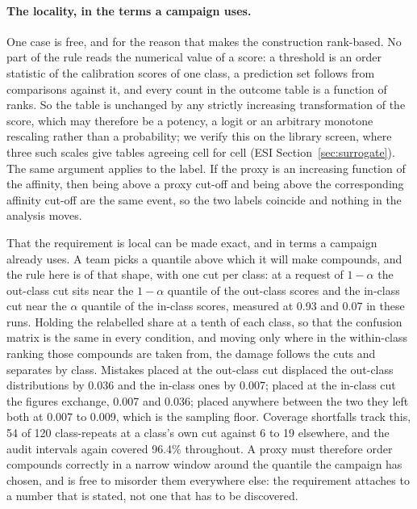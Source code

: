 \documentclass[10pt]{article}
\begin{document}
\paragraph{The locality, in the terms a campaign uses.}
One case is free, and for the reason that makes the construction rank-based. No part of the rule reads the numerical value of a score: a threshold is an order statistic of the calibration scores of one class, a prediction set follows from comparisons against it, and every count in the outcome table is a function of ranks. So the table is unchanged by any strictly increasing transformation of the score, which may therefore be a potency, a logit or an arbitrary monotone rescaling rather than a probability; we verify this on the library screen, where three such scales give tables agreeing cell for cell (ESI Section~\ref{sec:surrogate}). The same argument applies to the label. If the proxy is an increasing function of the affinity, then being above a proxy cut-off and being above the corresponding affinity cut-off are the same event, so the two labels coincide and nothing in the analysis moves.

That the requirement is local can be made exact, and in terms a campaign already uses. A team picks a quantile above which it will make compounds, and the rule here is of that shape, with one cut per class: at a request of $1-\alpha$ the out-class cut sits near the $1-\alpha$ quantile of the out-class scores and the in-class cut near the $\alpha$ quantile of the in-class scores, measured at 0.93 and 0.07 in these runs. Holding the relabelled share at a tenth of each class, so that the confusion matrix is the same in every condition, and moving only where in the within-class ranking those compounds are taken from, the damage follows the cuts and separates by class. Mistakes placed at the out-class cut displaced the out-class distributions by 0.036 and the in-class ones by 0.007; placed at the in-class cut the figures exchange, 0.007 and 0.036; placed anywhere between the two they left both at 0.007 to 0.009, which is the sampling floor. Coverage shortfalls track this, 54 of 120 class-repeats at a class's own cut against 6 to 19 elsewhere, and the audit intervals again covered 96.4\% throughout. A proxy must therefore order compounds correctly in a narrow window around the quantile the campaign has chosen, and is free to misorder them everywhere else: the requirement attaches to a number that is stated, not one that has to be discovered.
\end{document}
